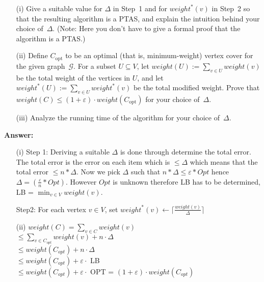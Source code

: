 \documentclass{article}
\newcommand{\G}{\ensuremath{\mathcal{G}}}
\newcommand{\graph}{\G}
\newcommand{\eps}{\varepsilon}
\renewcommand{\leq}{\leqslant}
\newcommand{\weight}{\mathit{weight}}
\newcommand{\optsub}{\mathrm{opt}}
\newcounter{rcounter}
\newenvironment{rlist}%
{\begin{list}{\setnr-\arabic{rcounter}}{\usecounter{rcounter}}}{\end{list}}
\begin{document}
\begin{rlist}
\begin{algorithm}
        \end{algorithm}
        \begin{enumerate}
            \item[(i)] Give a suitable value for $\Delta$ in Step~1 and for $\weight^*(v)$
            in Step~2 so that the resulting algorithm is a PTAS, and explain the intuition behind your choice of~$\Delta$. (Note: Here you don't have to give a formal proof 
            that the algorithm is a PTAS.)
            \\
            
            \item[(ii)] Define $C_{\optsub}$ to be an optimal (that is, minimum-weight) vertex cover for the given graph~$\graph$.
            For a subset $U\subseteq V$, let $\weight(U):=\sum_{v\in U}\weight(v)$
            be the total weight of the vertices in $U$, and let
            $\weight^*(U):=\sum_{v\in U}\weight^*(v)$ be the total modified weight.
            Prove that $\weight(C) \leq (1+\eps)\cdot \weight(C_{\optsub})$ for your choice of~$\Delta$.
            
            \item[(iii)] Analyze the running time of the algorithm for your choice of~$\Delta$.
        \end{enumerate}
        
        \textbf{Answer:}
        \begin{enumerate}
            \item[(i)]
            Step 1: Deriving a suitable $\Delta$ is done through determine the total error. The total error is the error on each item which is $\leq \Delta$ which means that the total error $\leq n * \Delta$. Now we pick $\Delta$ such that $n * \Delta \leq \varepsilon * Opt$ hence $\Delta = (\frac{\varepsilon}{n}*Opt)$. However $Opt$ is unknown therefore LB has to be determined, LB = $\min_{v\in V} \weight(v)$.
            
            Step2: For each vertex $v\in V$, set $\weight^*(v) \gets \lceil \frac{\weight(v)}{\Delta} \rceil$
            \item[(ii)]
            $\weight(C) = \sum_{v\in C} \weight(v)$
            \\$\leq \sum_{v\in C_{opt}} \weight(v) + n \cdot \Delta$
            \\$\leq \weight(C_{opt}) + n \cdot \Delta$
            \\$\leq \weight(C_{opt}) + \eps \cdot $ LB
            \\$\leq \weight(C_{opt}) + \eps \cdot $ OPT = $(1+ \eps) \cdot \weight(C_{opt})$
            

\end{enumerate}
\end{rlist}
\end{document}

